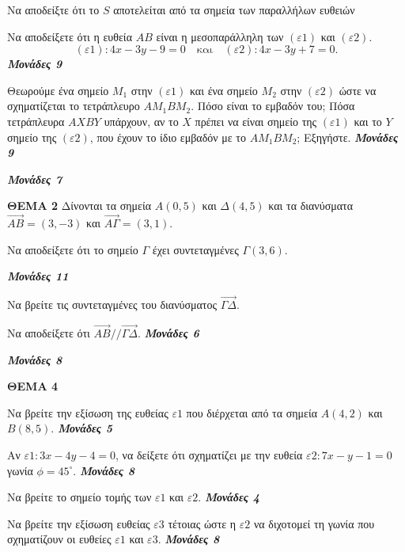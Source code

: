\documentclass[11pt,a4paper,twoside]{book}
\newcommand{\OnPar}[1]{{\notoserif\bfseries\fontsize{18}{22}\selectfont #1}}
\newcommand{\monades}[1]{
\hspace*{\fill}
\textbf{\textit{\textcolor{maincolor}{Μονάδες #1}}}}
\begin{document}
\begin{alist}    \item Να αποδείξτε ότι το $S$ αποτελείται από τα σημεία των παραλλήλων ευθειών
    \item Να αποδείξετε ότι η ευθεία $AB$ είναι η μεσοπαράλληλη των $(\varepsilon1)$ και $(\varepsilon2)$.  \[ (\varepsilon1): 4x - 3y - 9 = 0 \quad \text{και} \quad (\varepsilon2): 4x - 3y + 7 = 0. \] \monades{9}
    \item Θεωρούμε ένα σημείο $M_1$ στην $(\varepsilon1)$ και ένα σημείο $M_2$ στην $(\varepsilon2)$ ώστε να σχηματίζεται το τετράπλευρο $AM_1 BM_2$. Πόσο είναι το εμβαδόν του; Πόσα τετράπλευρα $AXBY$ υπάρχουν, αν το $X$ πρέπει να είναι σημείο της $(\varepsilon1)$ και το $Y$ σημείο της $(\varepsilon2)$, που έχουν το ίδιο εμβαδόν με το $AM_1 BM_2$; Εξηγήστε.  \monades{9}
 \monades{7}\end{alist}

\vspace{4mm}

\OnPar{ΘΕΜΑ 2}
Δίνονται τα σημεία $A(0,5)$ και $\Delta(4,5)$ και τα διανύσματα $\vec{AB} = (3, -3)$ και $\vec{A\Gamma} = (3,1)$.

\begin{alist}    \item Να αποδείξετε ότι το σημείο $\Gamma$ έχει συντεταγμένες $\Gamma(3,6)$.
    \item  \monades{11}
    \begin{rlist}
        \item Να βρείτε τις συντεταγμένες του διανύσματος $\vec{\Gamma\Delta}$.

        \item Να αποδείξετε ότι $\vec{AB}//\vec{\Gamma\Delta}$.  \monades{6}
 \monades{8}
    \end{rlist}\end{alist}

\vspace{4mm}

\textbf{ΘΕΜΑ 4}

\begin{alist}    \item Να βρείτε την εξίσωση της ευθείας $\varepsilon1$ που διέρχεται από τα σημεία $A(4,2)$ και $B(8,5)$. \monades{5}
    \item Αν $\varepsilon1: 3x - 4y - 4 = 0$, να δείξετε ότι σχηματίζει με την ευθεία $\varepsilon2: 7x - y - 1 = 0$ γωνία $\phi = 45^\circ$. \monades{8}
    \item Να βρείτε το σημείο τομής των $\varepsilon1$ και $\varepsilon2$. \monades{4}
    \item Να βρείτε την εξίσωση ευθείας $\varepsilon3$ τέτοιας ώστε η $\varepsilon2$ να διχοτομεί τη γωνία που σχηματίζουν οι ευθείες $\varepsilon1$ και $\varepsilon3$. \monades{8}
\end{alist}
\end{document}
